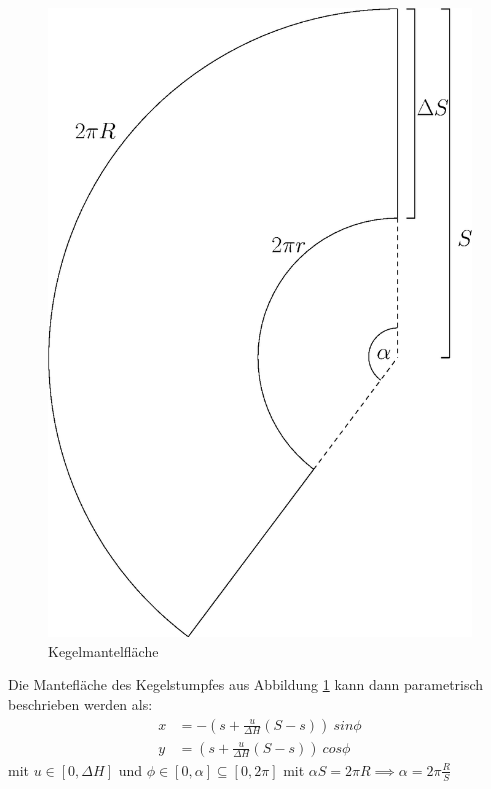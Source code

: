 \begin{figure}[!htb]
	\centering
	\includegraphics[scale=.4]{images/coneLateral.eps}
	\caption{Kegelmantelfläche}
	\label{fig:coneLateral}
\end{figure}

Die Mantefläche des Kegelstumpfes aus Abbildung \ref{fig:coneLateral} kann dann parametrisch beschrieben werden als:
\begin{equation} \label{eq:paramLateral}
\begin{aligned}
x &= -(s + \frac{u}{\Delta H}(S-s)) ~sin \phi \\
y &= (s + \frac{u}{\Delta H} (S-s)) ~cos \phi
\end{aligned}
\end{equation}
mit  $u\in [0, \Delta H]$ und $\phi \in [0, \alpha] \subseteq [0, 2\pi]$ mit $\alpha S = 2\pi R \implies \alpha = 2\pi\frac{R}{S}$


